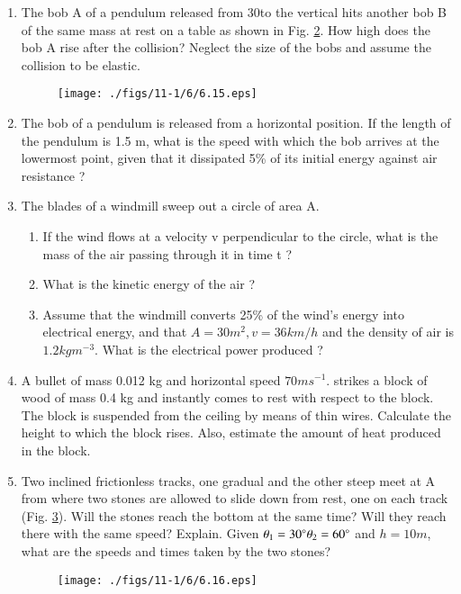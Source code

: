 \begin{enumerate}[label=\thesection.\arabic*.,ref=\thesection.\theenumi]
\begin{figure}[!ht]
\caption{}
\label{fig:6.6}
\end{figure}
\item The bob A of a pendulum released from 30\degree to the
vertical hits another bob B of the same mass at rest on a table as shown in Fig. \ref{fig:6.15}. How high does the bob A rise after the collision? Neglect the size of the bobs and assume the collision to be elastic.
\begin{figure}[!ht]
\texttt{[image: ./figs/11-1/6/6.15.eps]}
\caption{}
\label{fig:6.15}
\end{figure}
%
\item The bob of a pendulum is released from a horizontal position. If the length of the pendulum is 1.5 m, what is the speed with which the bob arrives at the lowermost point, given that it dissipated 5\% of its initial energy against air resistance ?
\item The blades of a windmill sweep out a circle of area A. 
\begin{enumerate}[label=(\alph*)]
\item  If the wind flows at a velocity v perpendicular to the circle, what is the mass of the air passing through it in time t ? 
\item  What is the kinetic energy of the air ? 
\item  Assume that the windmill converts 25\% of the wind’s energy into electrical energy, and that $A = 30 m^2, v = 36km/h$ and the density of air is $1.2 kg m^{-3}$. What is the electrical power produced ?
\end{enumerate}
\item A bullet of mass 0.012 kg and horizontal speed $70 m s^{-1}$.
strikes a block of wood of
mass 0.4 kg and instantly comes to rest with respect to the block. The block is suspended from the ceiling by means of thin wires. Calculate the height to which the block rises. Also, estimate the amount of heat produced in the block.
\item Two inclined frictionless tracks, one gradual and the other steep meet at A from where two stones are allowed to slide down from rest, one on each track (Fig. \ref{fig:6.16}). Will the stones reach the bottom at the same time? Will they reach there with the same speed? Explain. Given $\theta_1 = 30\degree\theta_2 = 60\degree$  and $h = 10m$, what are the speeds and times taken by the two stones?
\begin{figure}[!ht]
\texttt{[image: ./figs/11-1/6/6.16.eps]}
\caption{}
\label{fig:6.16}
\end{figure}

\end{enumerate}
